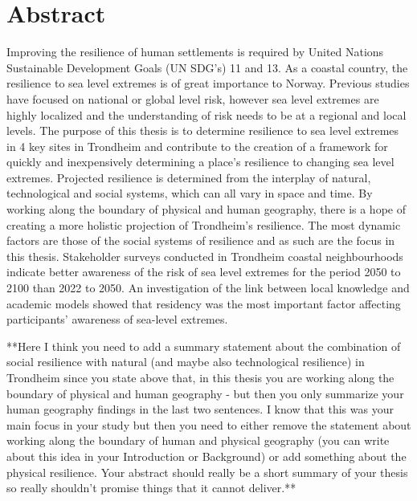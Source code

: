 

\section{Abstract}

Improving the resilience of human settlements is required by United Nations Sustainable Development Goals (UN SDG's) 11 and 13. As a coastal country, the resilience to sea level extremes is of great importance to Norway. Previous studies have focused on national or global level risk, however sea level extremes are highly localized  and the understanding of risk needs to be at a regional and local levels. The purpose of this thesis is to determine resilience to sea level extremes in 4 key sites in Trondheim and contribute to the creation of a framework for quickly and inexpensively determining a place's resilience to changing sea level extremes. Projected resilience is determined from the interplay of natural, technological and social systems, which can all vary in space and time. By working along the boundary of physical and human geography, there is a hope of creating a more holistic projection of Trondheim's resilience. The most dynamic factors are those of the social systems of resilience and as such are the focus in this thesis. Stakeholder surveys conducted in Trondheim coastal neighbourhoods indicate better awareness of the risk of sea level extremes for the period 2050 to 2100 than 2022 to 2050. An  investigation of the link between local knowledge and academic models showed that residency was the most important factor affecting participants' awareness of sea-level extremes.  


**Here I think you need to add a summary statement about the combination of social resilience with natural (and maybe also technological resilience) in Trondheim since you state above that, in this thesis you are working along the boundary of physical and human geography - but then you only summarize  your human geography findings in the last two sentences. I know that this was your main focus in your study but then you need to either remove the statement about working along the boundary of human and physical geography (you can write about this idea in your Introduction or Background) or add something about the physical resilience. Your abstract should really be a short summary of your thesis so really shouldn't promise things that it cannot deliver.**

